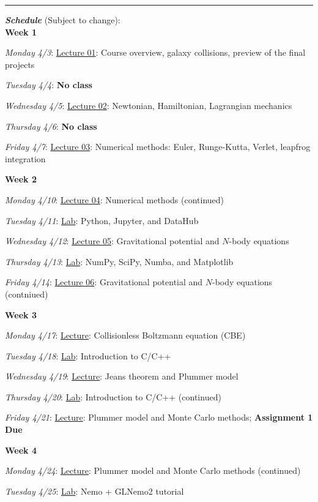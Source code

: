 \documentclass[12pt]{article}
\begin{document}
\begin{center}
  \rule{\textwidth}{0.5pt}
\end{center}

\noindent\textbf{\emph{Schedule}} (Subject to change):\\

\noindent\textbf{Week 1}

\emph{Monday 4/3}: \underline{Lecture 01}: Course overview, galaxy collisions, preview of the final projects

\emph{Tuesday 4/4}: \textbf{No class}

\emph{Wednesday 4/5}: \underline{Lecture 02}: Newtonian, Hamiltonian, Lagrangian mechanics

\emph{Thursday 4/6}: \textbf{No class}

\emph{Friday 4/7}: \underline{Lecture 03}: Numerical methods: Euler, Runge-Kutta, Verlet, leapfrog integration

\noindent\textbf{Week 2}

\emph{Monday 4/10}: \underline{Lecture 04}: Numerical methods (continued)

\emph{Tuesday 4/11}: \underline{Lab}: Python, Jupyter, and DataHub

\emph{Wednesday 4/12}: \underline{Lecture 05}: Gravitational potential and $N$-body equations

\emph{Thursday 4/13}: \underline{Lab}: NumPy, SciPy, Numba, and Matplotlib

\emph{Friday 4/14}: \underline{Lecture 06}: Gravitational potential and $N$-body equations (contniued)

\noindent\textbf{Week 3}

\emph{Monday 4/17}: \underline{Lecture}: Collisionless Boltzmann equation (CBE)

\emph{Tuesday 4/18}: \underline{Lab}: Introduction to C/C++

\emph{Wednesday 4/19}: \underline{Lecture}: Jeans theorem and Plummer model

\emph{Thursday 4/20}: \underline{Lab}: Introduction to C/C++ (continued)

\emph{Friday 4/21}: \underline{Lecture}: Plummer model and Monte Carlo methods; \textbf{Assignment 1 Due}

\noindent\textbf{Week 4}

\emph{Monday 4/24}: \underline{Lecture}: Plummer model and Monte Carlo methods (continued)

\emph{Tuesday 4/25}: \underline{Lab}: Nemo + GLNemo2 tutorial
\end{document}
